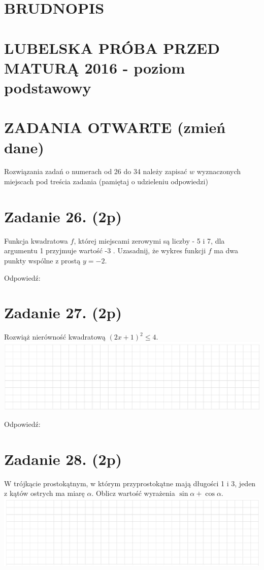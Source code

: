 \documentclass[10pt]{article}
\begin{document}
\section*{BRUDNOPIS}
\section*{LUBELSKA PRÓBA PRZED MATURĄ 2016 - poziom podstawowy}
\section*{ZADANIA OTWARTE (zmień dane)}
Rozwiązania zadań o numerach od 26 do 34 należy zapisać \(w\) wyznaczonych miejscach pod treścia zadania (pamiętaj o udzieleniu odpowiedzi)

\section*{Zadanie 26. (2p)}
Funkcja kwadratowa \(f\), której miejscami zerowymi są liczby - 5 i 7, dla argumentu 1 przyjmuje wartość -3 . Uzasadnij, że wykres funkcji \(f\) ma dwa punkty wspólne z prostą \(y=-2\).

Odpowiedź:

\section*{Zadanie 27. (2p)}
Rozwiąż nierówność kwadratową \((2 x+1)^{2} \leq 4\).\\
\includegraphics[max width=\textwidth, center]{2024_11_21_9d761ca624f0efee99a4g-08}

Odpowiedź:

\section*{Zadanie 28. (2p)}
W trójkącie prostokątnym, w którym przyprostokątne mają długości 1 i 3, jeden z kątów ostrych ma miarę \(\alpha\). Oblicz wartość wyrażenia \(\sin \alpha+\cos \alpha\).\\
\includegraphics[max width=\textwidth, center]{2024_11_21_9d761ca624f0efee99a4g-08(1)}
\end{document}
